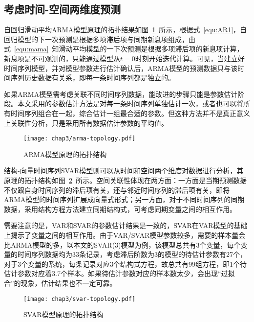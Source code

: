 \subsection{考虑时间-空间两维度预测}

自回归滑动平均ARMA模型原理的拓扑结果如图~\ref{fig:ARMA模型原理的拓扑结构}~所示，根据式~\ref{equ:AR1}，自回归模型的下一次预测是根据多项滞后项与同期新息项组成，由式~\ref{equ:mama}~知滑动平均模型的一下次预测是根据多项滞后项的新息项计算，新息项是不可观测的，只能通过模型从$t=0$时刻开始迭代计算。可见，当建立好时间序列模型，并对模型参数进行估计确认后，ARMA模型的预测数据只与该时间序列历史数据有关系，即每一条时间序列都是独立的。

如果ARMA模型需考虑关联不同时间序列数据，能改进的步骤只能是参数估计阶段。本文采用的参数估计方法是对每一条时间序列单独估计一次，或者也可以将所有时间序列组合在一起，综合估计一组最合适的参数。但这种方法并不是真正意义上关联性分析，只是采用所有数据估计参数的平均值。

\begin{figure}[htb!]
    \centering
    \texttt{[image: chap3/arma-topology.pdf]}
    \caption{ARMA模型原理的拓扑结构}
    \label{fig:ARMA模型原理的拓扑结构}
\end{figure}

结构-向量时间序列SVAR模型则可以从时间和空间两个维度对数据进行分析，其原理的拓扑结构如图~\ref{fig:SVAR模型原理的拓扑结构}~所示。空间关联性体现在两方面：一方面是当期预测数据不仅跟自身时间序列的滞后项有关，还与邻近时间序列的滞后项有关，即将ARMA模型的时间序列扩展成向量式形式；另一方面，对于不同时间序列的同期数据，采用结构方程方法建立同期结构式，可考虑同期变量之间的相互作用。

需要注意的是，VAR和SVAR的参数估计结果是一致的，SVAR在VAR模型的基础上揭示了变量之间的相互作用。由于VAR/SVAR模型参数较多，需要的样本量会比ARMA模型的多，以本文的SVAR(3)模型为例，该模型总共有3个变量，每个变量的时间序列数据均为33条记录，考虑滞后阶数为3的模型的待估计参数有27个，对于3个变量的系统，每条记录对应3个结构式方程，故总共有99组方程，即1个待估计参数对应着3.7个样本。如果待估计参数对应的样本数太少，会出现“过拟合”的现象，估计结果也不一定可靠。

\begin{figure}[htb!]
    \centering
    \texttt{[image: chap3/svar-topology.pdf]}
    \caption{SVAR模型原理的拓扑结构}
    \label{fig:SVAR模型原理的拓扑结构}
\end{figure}

